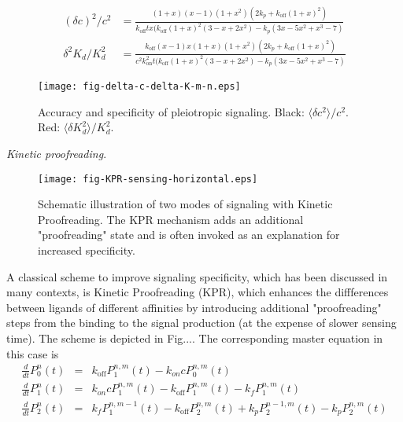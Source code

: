 \documentclass[prl,showpacs]{revtex4}
\begin{document}
\begin{eqnarray}
(\delta c)^2/c^2 & = \frac{(1+x)(x-1)(1+x^2)(2k_p + k_{\text{off}}(1+x)^2)}{k_{\text{off}} t x (k_{\text{off}} (1+x)^2 (3-x+2x^2)-k_p(3x-5x^2+x^3-7)} \\
\delta^2K_d/K_d^2 & = \frac{k_{\text{off}}(x-1)x(1+x)(1+x^2)(2k_p+k_{\text{off}}(1+x)^2)}{c^2k_{\text{on}}^2 t (k_{\text{off}}(1+x)^2(3-x+2x^2)-k_p(3x-5x^2+x^3-7)}
\end{eqnarray}

\begin{figure}
    \texttt{[image: fig-delta-c-delta-K-m-n.eps]}
    \caption{Accuracy and specificity of pleiotropic signaling. Black: $\langle \delta c^2\rangle /c^2$. Red: $\langle \delta K_d^2\rangle/K_d^2$.}
\end{figure}

\emph{Kinetic proofreading}.
%
\begin{figure}
    \texttt{[image: fig-KPR-sensing-horizontal.eps]}
    \caption{Schematic illustration of two modes of signaling with Kinetic Proofreading. The KPR mechanism adds an additional "proofreading" state and is often invoked as an explanation for increased specificity.}
\end{figure}
%
A classical scheme to improve signaling specificity, which has been discussed in many contexts, is Kinetic Proofreading (KPR), which enhances the diffferences between ligands of different affinities by introducing additional "proofreading" steps from the binding to the signal production (at the expense of slower sensing time). The scheme is depicted in Fig.... The corresponding master equation in this case is
%
\begin{eqnarray}
\frac{d}{dt}P_0^n(t)&=&k_{\text{off}}P_1^{n,m}(t)-k_{on}c P_0^{n,m}(t)\nonumber\\
\frac{d}{dt}P_1^n(t)&=&k_{on}cP_1^{n,m}(t)-k_{\text{off}} P_1^{n,m}(t)-k_fP_1^{n,m}(t)\\
\frac{d}{dt}P_2^n(t)&=&k_{f}P_1^{n,m-1}(t)-k_{\text{off}} P_2^{n,m}(t)+k_pP_2^{n-1,m}(t)- k_pP_2^{n,m}(t)\nonumber
\end{eqnarray}
\end{document}

